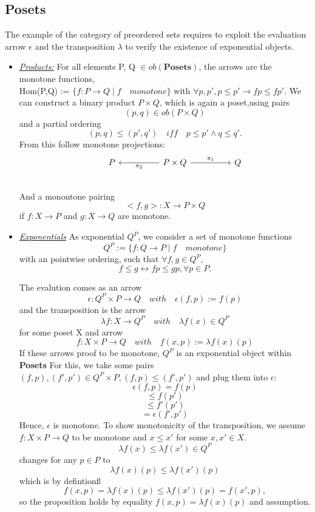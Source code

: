 \newpage

  \subsection{\textbf{Posets}}
  The example of the category of preordered sets requires to exploit the evaluation arrow $\epsilon$ and the transposition $\lambda$ to verify the existence of exponential objects.
    \begin{itemize}
  \item \underline{\textit{Products:}}
    For all elements P, Q $\in ob(\textbf{Posets})$, the arrows are the monotone functions,
    \\ Hom(P,Q) := $\{f: P \to Q \mid f \quad  monotone \}$ with $\forall p,p', p\leq p' \to f p \leq f p'$.
  We can construct a binary product $P \times Q$, which is again a poset,using pairs $$(p,q) \in ob(P\times Q)$$ and a partial ordering $$(p,q) \leq (p',q') \quad iff\quad p \leq p' \wedge q \leq q' .$$
  From this follow monotone projections: \\
\[
  \begin{tikzcd}
    & P && P\times Q \arrow{ll}{\pi_2} \arrow{rr}{\pi_1}  &&  Q\\
  \end{tikzcd}
\]
  And a monontone pairing
  $$ <f,g>: X \to P\times Q$$
  if $f:X \to P$ and $g: X\to Q$ are monotone.

\item \underline{\textit{Exponentials}}
  As exponential $Q^P$, we consider a set of monotone functions
  $$Q^P:=\{f:Q\to P \mid f \quad monotone \}$$
  with an pointwise ordering, such that $\forall f,g \in Q^P$,
  $$ f \leq g \leftrightarrow f p \leq g p,\forall p \in P.$$

  The evalution comes as an arrow
  $$\epsilon: Q^P\times P \to Q \quad with \quad \epsilon(f,p):=f(p)$$
  and the transposition is the arrow
  $$\lambda f : X \to Q^P \quad with \quad \lambda f(x) \in Q^P$$
  for some poset X and arrow
  $$f:X \times P \to Q \quad with \quad f(x,p):=\lambda f(x)(p)$$
  If these arrows proof to be monotone, $Q^P$ is an exponential object within \textbf{Posets}
  For this, we take some pairs $(f,p),(f',p')\in Q^P\times P, (f,p)\leq(f',p')$ and plug them into $\epsilon$:
  $$\epsilon(f,p) = f(p)$$
  $$\leq f(p')$$
  $$\leq f'(p') $$
  $$=\epsilon(f',p') $$
  Hence, $\epsilon$ is monotone. To show monotonicity of the transposition, we assume
  $f:X\times P \to Q$ to be monotone and $x\leq x'$ for some $x,x' \in X$.
  $$\lambda f(x) \leq \lambda f(x') \in Q^P$$
  changes for any $p \in P$ to
  $$\lambda f(x)(p)\leq \lambda f(x')(p)$$
  which is by defintionß
  $$f(x,p)= \lambda f (x)(p) \leq \lambda f(x')(p) = f(x',p),$$
  so the proposition holds by equality $f(x,p)=\lambda f (x)(p)$ and assumption.
  \end{itemize}
  \newpage

